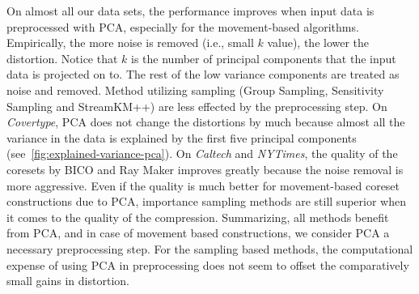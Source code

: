 On almost all our data sets, the performance improves when input data is preprocessed with PCA, especially for the movement-based algorithms. Empirically, the more noise is removed (i.e., small $k$ value), the lower the distortion. Notice that $k$ is the number of principal components that the input data is projected on to. The rest of the low variance components are treated as noise and removed. Method utilizing sampling (Group Sampling, Sensitivity Sampling and StreamKM++) are less effected by the preprocessing step. On \textit{Covertype}, PCA does not change the distortions by much because almost all the variance in the data is explained by the first five principal components (see~\cref{fig:explained-variance-pca}). 
On \textit{Caltech} and \textit{NYTimes}, the quality of the coresets by BICO and Ray Maker improves greatly because the noise removal is more aggressive. Even if the quality is much better for movement-based coreset constructions due to PCA, importance sampling methods are still superior when it comes to the quality of the compression. Summarizing, all methods benefit from PCA, and in case of movement based constructions, we consider PCA a necessary preprocessing step. For the sampling based methods, the computational expense of using PCA in preprocessing does not seem to offset the comparatively small gains in distortion.


